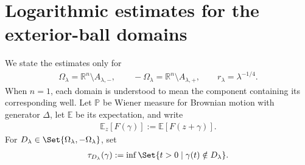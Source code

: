 \documentclass[a4paper,10pt]{article}
\numberwithin{equation}{section}
\theoremstyle{plain}
\theoremstyle{plain}
\theoremstyle{plain}
\theoremstyle{plain}
\theoremstyle{plain}
\theoremstyle{remark}
\theoremstyle{definition}
\newcommand{\RR}{\mathbb{R}}
\newcommand{\PP}{\mathbb{P}}
\newcommand{\EE}{\mathbb{E}}
\newcommand\norm[1]{\left\lVert#1\right\rVert}
\newcommand{\eq}[1]{\begin{align*}#1\end{align*}}
\begin{document}



\section{Logarithmic estimates for the exterior-ball domains}
\label{sec:exterior-ball-path-estimates}

We state the estimates only for
\eq{
\Omega_\lambda
=
\RR^n\setminus A_{\lambda,-},
\qquad
-\Omega_\lambda
=
\RR^n\setminus A_{\lambda,+},
\qquad
r_\lambda=\lambda^{-1/4}.
}
When $n=1$, each domain is understood to mean the component containing
its corresponding well. Let $\PP$ be Wiener measure for Brownian motion
with generator $\Delta$, let $\EE$ be its expectation, and write
\eq{
\EE_z[F(\gamma)]
:=
\EE[F(z+\gamma)].
}
For $D_\lambda\in\Set{\Omega_\lambda,-\Omega_\lambda}$, set
\eq{
\tau_{D_\lambda}(\gamma)
:=
\inf\Set{
t>0
\mid
\gamma(t)\notin D_\lambda
}.
}
\end{document}
